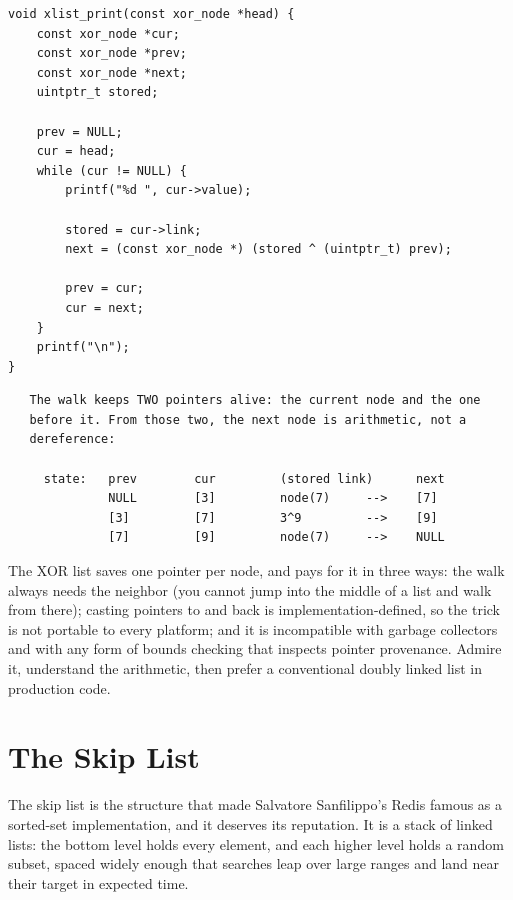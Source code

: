 \begin{lstlisting}[caption={Walk forward, remembering the predecessor.}]
void xlist_print(const xor_node *head) {
    const xor_node *cur;
    const xor_node *prev;
    const xor_node *next;
    uintptr_t stored;

    prev = NULL;
    cur = head;
    while (cur != NULL) {
        printf("%d ", cur->value);

        stored = cur->link;
        next = (const xor_node *) (stored ^ (uintptr_t) prev);

        prev = cur;
        cur = next;
    }
    printf("\n");
}
\end{lstlisting}

\begin{verbatim}
   The walk keeps TWO pointers alive: the current node and the one
   before it. From those two, the next node is arithmetic, not a
   dereference:

     state:   prev        cur         (stored link)      next
              NULL        [3]         node(7)     -->    [7]
              [3]         [7]         3^9         -->    [9]
              [7]         [9]         node(7)     -->    NULL
\end{verbatim}

\begin{ruleofthumb}
The XOR list saves one pointer per node, and pays for it in three ways:
the walk always needs the neighbor (you cannot jump into the middle of
a list and walk from there); casting pointers to  and
back is implementation-defined, so the trick is not portable to every
platform; and it is incompatible with garbage collectors and with any
form of bounds checking that inspects pointer provenance. Admire it,
understand the arithmetic, then prefer a conventional doubly linked
list in production code.
\end{ruleofthumb}

\section{The Skip List}

The skip list is the structure that made Salvatore Sanfilippo's
Redis famous as a sorted-set implementation, and it deserves its
reputation. It is a stack of linked lists: the bottom level holds every
element, and each higher level holds a random subset, spaced widely
enough that searches leap over large ranges and land near their target
in  expected time.

